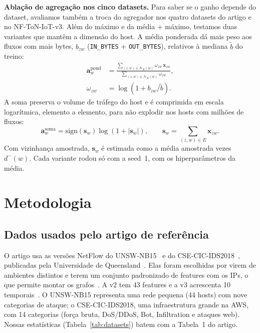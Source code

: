 \documentclass[conference]{IEEEtran}
\newcommand{\vect}[1]{\mathbf{#1}}
\begin{document}
\textbf{Ablação de agregação nos cinco datasets.} Para saber se o ganho depende
do dataset, avaliamos também a troca do agregador nos quatro datasets do artigo
e no NF-ToN-IoT-v3. Além do máximo e da média + máximo, testamos duas variantes
que mantêm a dimensão do host. A média ponderada dá mais peso aos fluxos com
mais bytes, $b_{zw}$ (\texttt{IN\_BYTES} + \texttt{OUT\_BYTES}), relativos à
mediana $\tilde{b}$ do treino:
\begin{align}
\vect{a}^{\mathrm{pond}}_w&=\frac{\sum_{(z,w)\in\mathcal{N}_K(w)} \omega_{zw}\,\vect{x}_{zw}}{\sum_{(z,w)\in\mathcal{N}_K(w)} \omega_{zw}},\\
\omega_{zw}&=\log\left(1+b_{zw}/\tilde{b}\right).
\end{align}
A soma preserva o volume de tráfego do host e é comprimida em escala
logarítmica, elemento a elemento, para não explodir nos hosts com milhões de
fluxos:
\begin{equation}
\vect{a}^{\mathrm{soma}}_w=\mathrm{sign}(\vect{s}_w)\log\left(1+|\vect{s}_w|\right),\qquad
\vect{s}_w=\sum_{(z,w)\in E} \vect{x}_{zw}.
\end{equation}
Com vizinhança amostrada, $\vect{s}_w$ é estimada como a média amostrada vezes
$d^{-}(w)$. Cada variante rodou só com a seed~1, com os hiperparâmetros da
média.

\section{Metodologia}

\subsection{Dados usados pelo artigo de referência}

O artigo usa as versões NetFlow do UNSW-NB15~\cite{moustafa2015unsw} e do
CSE-CIC-IDS2018~\cite{sharafaldin2018cicids}, publicadas pela Universidade de
Queensland~\cite{uq_nids}. Elas foram escolhidas por virem de ambientes
distintos e terem um conjunto padronizado de features com os IPs, o que permite
montar os grafos~\cite{sarhan2021standard}. A v2 tem 43 features e a v3
acrescenta 10 temporais~\cite{luay2025temporal}. O UNSW-NB15 representa uma rede
pequena (44 hosts) com nove categorias de ataque; o CSE-CIC-IDS2018, uma
infraestrutura grande na AWS, com 14 categorias (força bruta, DoS/DDoS, Bot,
Infiltration e ataques web). Nossas estatísticas (Tabela~\ref{tab:datasets})
batem com a Tabela~1 do artigo.
\end{document}
